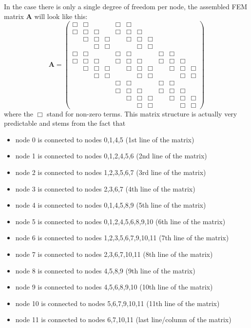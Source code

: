 \noindent In the case there is only a single degree of freedom per node, the 
assembled FEM matrix ${\bm A}$ will look like this:
\[
{\bm A}=
\left(
\begin{array}{cccccccccccc}
\Box & \Box &      &      & \Box & \Box &      &      &      &      &      &      \\
\Box & \Box & \Box &      & \Box & \Box & \Box &      &      &      &      &      \\
     & \Box & \Box & \Box &      & \Box & \Box & \Box &      &      &      &      \\
     &      & \Box & \Box &      &      & \Box & \Box &      &      &      &      \\
\Box & \Box &      &      & \Box & \Box &      &      & \Box & \Box &      &      \\
\Box & \Box & \Box &      & \Box & \Box & \Box &      & \Box & \Box & \Box &      \\
     & \Box & \Box & \Box &      & \Box & \Box & \Box &      & \Box & \Box & \Box \\
     &      & \Box & \Box &      &      & \Box & \Box &      &      & \Box & \Box \\
     &      &      &      & \Box & \Box &      &      & \Box & \Box &      &      \\
     &      &      &      & \Box & \Box & \Box &      & \Box & \Box & \Box &      \\
     &      &      &      &      & \Box & \Box & \Box &      & \Box & \Box & \Box \\
     &      &      &      &      &      & \Box & \Box &      &      & \Box & \Box 
\end{array}
\right)
\]
where the $\Box$ stand for non-zero terms.
This matrix structure is actually very predictable and stems from the fact that
\begin{itemize}
\item node 0 is connected to nodes 0,1,4,5 (1st line of the matrix)
\item node 1 is connected to nodes 0,1,2,4,5,6 (2nd line of the matrix)
\item node 2 is connected to nodes 1,2,3,5,6,7 (3rd line of the matrix)
\item node 3 is connected to nodes 2,3,6,7 (4th line of the matrix)
\item node 4 is connected to nodes 0,1,4,5,8,9 (5th line of the matrix)
\item node 5 is connected to nodes 0,1,2,4,5,6,8,9,10  (6th line of the matrix)
\item node 6 is connected to nodes 1,2,3,5,6,7,9,10,11 (7th line of the matrix)
\item node 7 is connected to nodes 2,3,6,7,10,11 (8th line of the matrix)
\item node 8 is connected to nodes 4,5,8,9 (9th line of the matrix)
\item node 9 is connected to nodes 4,5,6,8,9,10 (10th line of the matrix)
\item node 10 is connected to nodes 5,6,7,9,10,11  (11th line of the matrix)
\item node 11 is connected to nodes 6,7,10,11 (last line/column of the matrix)
\end{itemize}
